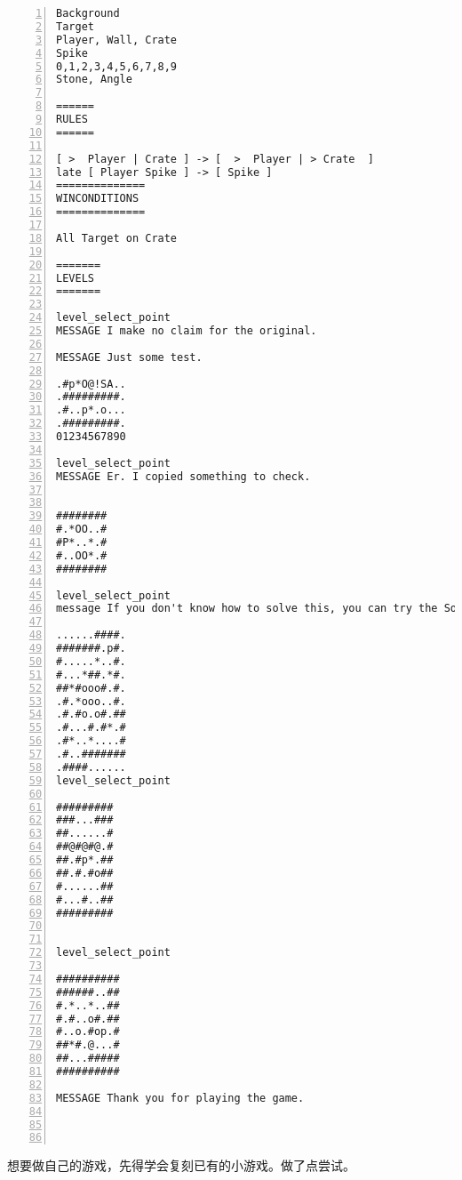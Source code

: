 \documentclass[11pt]{amsart}
\begin{document}
\begin{lstlisting}[numbers=left,numberstyle=\tiny,numbersep=10pt]
Background
Target
Player, Wall, Crate
Spike
0,1,2,3,4,5,6,7,8,9
Stone, Angle

======
RULES     
======     

[ >  Player | Crate ] -> [  >  Player | > Crate  ]
late [ Player Spike ] -> [ Spike ]
==============
WINCONDITIONS
==============

All Target on Crate     

=======     
LEVELS
=======

level_select_point
MESSAGE I make no claim for the original. 

MESSAGE Just some test.

.#p*O@!SA..
.#########.
.#..p*.o...
.#########.
01234567890

level_select_point
MESSAGE Er. I copied something to check.


########
#.*OO..#
#P*..*.#
#..OO*.#
########

level_select_point
message If you don't know how to solve this, you can try the SokobanAutomaticSolver:  http://m.wodown.com/soft/14821.html#downAddress

......####.
#######.p#.
#.....*..#.
#...*##.*#.
##*#ooo#.#.
.#.*ooo..#.
.#.#o.o#.##
.#...#.#*.#
.#*..*....#
.#..#######
.####......
level_select_point

#########
###...###
##......#
##@#@#@.#
##.#p*.##
##.#.#o##
#......##
#...#..##
#########


level_select_point

##########
######..##
#.*..*..##
#.#..o#.##
#..o.#op.#
##*#.@...#
##...#####
##########

MESSAGE Thank you for playing the game.




\end{lstlisting}

想要做自己的游戏，先得学会复刻已有的小游戏。做了点尝试。
\end{document}

